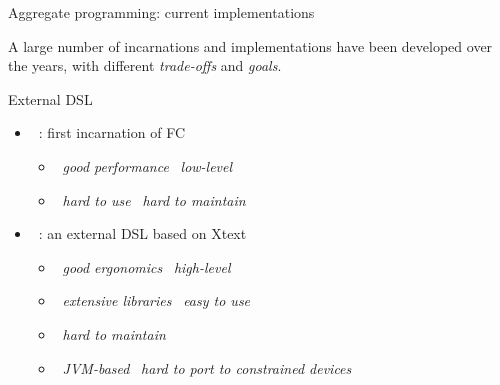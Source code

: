 \documentclass[presentation, 9pt]{beamer}\mode<presentation>{\usetheme{AMSBolognaFC}}
\begin{document}
\begin{frame}[allowframebreaks]{Aggregate programming: current implementations}
	\begin{center}
	A large number of incarnations and implementations have been developed over the years, with different \emph{trade-offs} and \emph{goals}.
	\end{center}
	\begin{exampleblock}{External DSL}
		\begin{itemize}
			\item {}~\cite{proto}: first incarnation of FC
			\begin{itemize}
				\item \faThumbsUp \, \emph{good performance} \faArrowRight \, \emph{low-level}
				\item \faThumbsDown \, \emph{hard to use} \faArrowRight \, \emph{hard to maintain}
			\end{itemize}
			\item {}~\cite{protelis}: an external DSL based on Xtext
			\begin{itemize}
				\item \faThumbsUp \, \emph{good ergonomics} \faArrowRight \, \emph{high-level}
				\item \faThumbsUp \, \emph{extensive libraries} \faArrowRight \, \emph{easy to use}
				\item \faThumbsDown \, \emph{hard to maintain}
				\item \faThumbsDown \, \emph{JVM-based} \faArrowRight \, \emph{hard to port to constrained devices}
			\end{itemize}
		\end{itemize}
	\end{exampleblock}


\end{frame}
\end{document}
